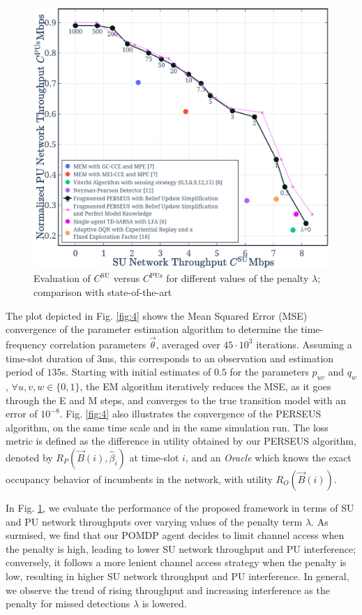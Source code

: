 \documentclass[10pt,twocolumn]{IEEEtran}
\begin{document}
\begin{figure}[t]
    \centering
    \includegraphics[width=0.72\linewidth]{Evaluation_2.png}
    \caption{Evaluation of $C^{\text{SU}}$ versus $C^{\text{PUs}}$ for different values of the penalty $\lambda$; comparison with state-of-the-art}
    \label{fig:8}
    \vspace{-6mm}
\end{figure}

The plot depicted in Fig. \ref{fig:4} shows the Mean Squared Error (MSE) convergence of the parameter estimation algorithm to determine the time-frequency correlation parameters $\vec{\theta}$, averaged over $45{\cdot} 10^3$ iterations. Assuming a time-slot duration of $3$ms, this corresponds to an observation and estimation period of $135$s. Starting with initial estimates of $0.5$ for the parameters $p_{uv}$ and $q_{w}$, ${\forall}u,v,w{\in}\{0,1\}$, the EM algorithm iteratively reduces the MSE, as it goes through the E and M steps, and converges to the true transition model with an error of $10^{-8}$. Fig. \ref{fig:4} also illustrates the convergence of the PERSEUS algorithm, on the same time scale and in the same simulation run. The loss metric is defined as the difference in utility obtained by our PERSEUS algorithm, denoted by $R_{P}(\vec{B}(i), \hat{\beta}_{i})$ at time-slot $i$, and an \emph{Oracle} which knows the exact occupancy behavior of incumbents in the network, with utility $R_{O}(\vec{B}(i))$.

In Fig. \ref{fig:8}, we evaluate the performance of the proposed framework in terms of SU and PU network throughputs over varying values of the penalty term $\lambda$. As surmised, we find that our POMDP agent decides to limit channel access when the penalty is high, leading to lower SU network throughput and PU interference; conversely, it follows a more lenient channel access strategy when the penalty is low, resulting in higher SU network throughput and PU interference. In general, we observe the trend of rising throughput and increasing interference as the penalty for missed detections $\lambda$ is lowered.
\end{document}
